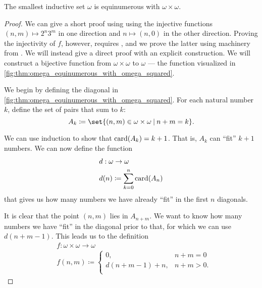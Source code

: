 \begin{proposition}\label{thm:omega_equinumerous_with_omega_squared}
  The smallest inductive set \( \omega \) is equinumerous with \( \omega \times \omega \).
\end{proposition}
\begin{proof}
  We can give a short proof using  using the injective functions \( (n, m) \mapsto 2^n 3^m \) in one direction and \( n \mapsto (n, 0) \) in the other direction. Proving the injectivity of \( f \), however, requires , and we prove the latter using machinery from . We will instead give a direct proof with an explicit construction. We will construct a bijective function from \( \omega \times \omega \) to \( \omega \) --- the function visualized in \cref{fig:thm:omega_equinumerous_with_omega_squared}.

  We begin by defining the diagonal in \cref{fig:thm:omega_equinumerous_with_omega_squared}. For each natural number \( k \), define the set of pairs that sum to \( k \):
  \begin{equation*}
    A_k \coloneqq \set{ (n, m) \in \omega \times \omega \given n + m = k }.
  \end{equation*}

  We can use induction to show that \( \operatorname{card}(A_k) = k + 1 \). That is, \( A_k \) can \enquote{fit} \( k + 1 \) numbers. We can now define the function
  \begin{equation*}
    \begin{aligned}
      &d: \omega \to \omega \\
      &d(n) \coloneqq \sum_{k=0}^n \operatorname{card}(A_n)
    \end{aligned}
  \end{equation*}
  that gives us how many numbers we have already \enquote{fit} in the first \( n \) diagonals.

  It is clear that the point \( (n, m) \) lies in \( A_{n + m} \). We want to know how many numbers we have \enquote{fit} in the diagonal prior to that, for which we can use \( d(n + m - 1) \). This leads us to the definition
  \begin{equation*}
    \begin{aligned}
      &f: \omega \times \omega \to \omega \\
      &f(n, m) \coloneqq \begin{cases}
        0,                &n + m = 0 \\
        d(n + m - 1) + n, &n + m > 0. \\
      \end{cases}
    \end{aligned}
  \end{equation*}


\end{proof}
